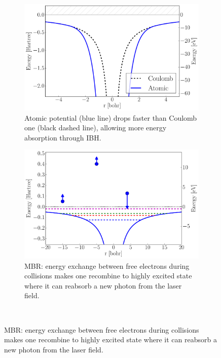 \begin{figure}
 \centering
    \begin{subfigure}{0.48\columnwidth}
        \centering
        \includegraphics[width=\textwidth]{figures/heating_atomic_potential}
        \caption{Atomic potential (blue line) drops faster than Coulomb one
                (black dashed line), allowing more energy absorption through
                IBH.\\}
        \label{fig:heating:atomic_pot}
    \end{subfigure}
%
    \begin{subfigure}{0.48\columnwidth}
        \centering
        \includegraphics[width=\textwidth]{figures/heating_mbr}
        \caption{MBR: energy exchange between free electrons during collisions
                 makes one recombine to highly excited state where it can
                 reabsorb a new photon from the laser field.}
        \label{fig:heating:mbr}
    \end{subfigure}
\\

\end{figure}
